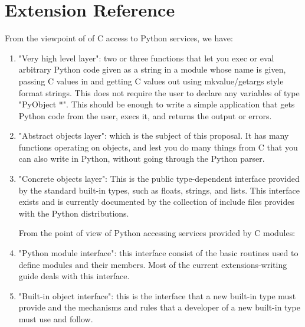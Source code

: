 \newcommand{\cfuncline}[3]{\item[\code{#1 #2(\varvars{#3})}]\ttindex{#2}}
\newcommand{\cfuncdesc}[3]{\fulllineitems\cfuncline{#1}{#2}{#3}}
\let\endcfuncdesc\endfulllineitems

\newcommand{\NULL}{\code{NULL}}

\chapter{Extension Reference}

From the viewpoint of of C access to Python services, we have:

\begin{enumerate}
  \item "Very high level layer": two or three functions that let you exec or
    eval arbitrary Python code given as a string in a module whose name is
    given, passing C values in and getting C values out using
    mkvalue/getargs style format strings.  This does not require the user
    to declare any variables of type "PyObject *".  This should be enough
    to write a simple application that gets Python code from the user,
    execs it, and returns the output or errors.

  \item "Abstract objects layer": which is the subject of this proposal.
    It has many functions operating on objects, and lest you do many
    things from C that you can also write in Python, without going
    through the Python parser.

  \item "Concrete objects layer": This is the public type-dependent
    interface provided by the standard built-in types, such as floats,
    strings, and lists.  This interface exists and is currently
    documented by the collection of include files provides with the
    Python distributions.

  From the point of view of Python accessing services provided by C
  modules: 

  \item "Python module interface": this interface consist of the basic
    routines used to define modules and their members.  Most of the
    current extensions-writing guide deals with this interface.

  \item "Built-in object interface": this is the interface that a new
    built-in type must provide and the mechanisms and rules that a
    developer of a new built-in type must use and follow.
\end{enumerate}

